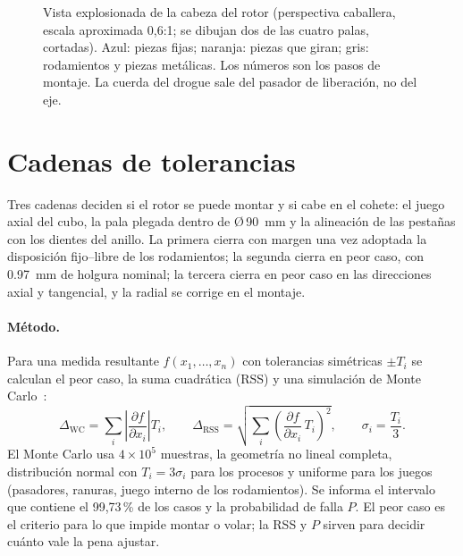 \begin{figure}[H]
\caption{Vista explosionada de la cabeza del rotor (perspectiva caballera, escala
aproximada 0,6:1; se dibujan dos de las cuatro palas, cortadas). Azul: piezas fijas;
naranja: piezas que giran; gris: rodamientos y piezas metálicas. Los números son los pasos
de montaje. La cuerda del drogue sale del pasador de liberación, no del eje.}
\label{fig:fabricacion-explo}
\end{figure}

\section{Cadenas de tolerancias}\label{sec:fabricacion-tol}

Tres cadenas deciden si el rotor se puede montar y si cabe en el cohete: el juego axial
del cubo, la pala plegada dentro de Ø\,\SI{90}{mm} y la alineación de las pestañas con
los dientes del anillo. La primera cierra con margen una vez adoptada la disposición
fijo--libre de los rodamientos; la segunda cierra en peor caso, con \SI{0.97}{mm} de holgura nominal; la
tercera cierra en peor caso en las direcciones axial y tangencial, y la radial se corrige en el montaje.

\paragraph{Método.} Para una medida resultante $f(x_1,\dots,x_n)$ con tolerancias
simétricas $\pm T_i$ se calculan el peor caso, la suma cuadrática (RSS) y una simulación de
Monte Carlo~\cite{fabricacion-creveling1997}:
\begin{equation}
  \Delta_{\text{WC}} = \sum_i \left|\frac{\partial f}{\partial x_i}\right| T_i ,\qquad
  \Delta_{\text{RSS}} = \sqrt{\sum_i \left(\frac{\partial f}{\partial x_i}\,T_i\right)^2},
  \qquad \sigma_i = \frac{T_i}{3}.
  \label{eq:fabricacion-wc}
\end{equation}
El Monte Carlo usa $4\times10^5$ muestras, la geometría no lineal completa, distribución
normal con $T_i=3\sigma_i$ para los procesos y uniforme para los juegos (pasadores,
ranuras, juego interno de los rodamientos). Se informa el intervalo que contiene el 99,73\,\%
de los casos y la probabilidad de falla $P$. El peor caso es el criterio para lo que
impide montar o volar; la RSS y $P$ sirven para decidir cuánto vale la pena ajustar.

